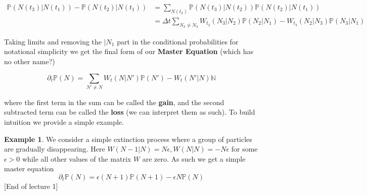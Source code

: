 \documentclass{article}
\theoremstyle{definition}
\newtheorem{example}{Example}
\begin{document}
\begin{align*}
  \mathbb{P}(N(t_3) | N(t_1)) - \mathbb{P}(N(t_2) | N(t_1))
  &= \sum_{N(t_2)} \mathbb{P}(N(t_3) | N(t_2)) \mathbb{P}(N(t_2) | N(t_1)) \\
  &= \Delta t \sum_{N_2 \neq N_3} W_{t_2}(N_3 | N_2) \mathbb{P}(N_2 | N_1) -
    W_{t_3}(N_2 | N_3) \mathbb{P}(N_3 | N_1)
\end{align*}

Taking limits and removing the $|N_1$ part in the conditional probabilities for
notational simplicity we get the final form of our \textbf{Master Equation}
(which has no other name?)

$$ \partial_t \mathbb{P}(N) = \sum_{N' \neq N} W_t(N | N') \mathbb{P}(N') -
W_t(N' | N) \mathbb{N} $$

where the first term in the sum can be called the \textbf{gain}, and the second
subtracted term can be called the \textbf{loss} (we can interpret them as such).
To build intuition we provide a simple example.

\begin{example}
  We consider a simple extinction process where a group of particles are
  gradually disappearing. Here $W(N - 1|N) = N\epsilon, W(N|N) = -N\epsilon$ for
  some $\epsilon > 0$ while all other values of the matrix $W$ are zero. As such
  we get a simple master equation
  $$ \partial_t \mathbb{P}(N) = \epsilon(N + 1) \mathbb{P}(N + 1) - \epsilon N
  \mathbb{P}(N) $$
  [End of lecture 1]
\end{example}
\end{document}
